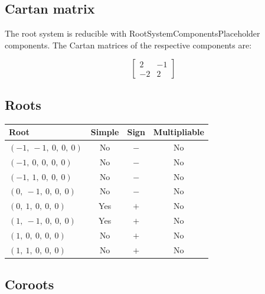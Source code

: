 \documentclass[11pt]{article}
\theoremstyle{definition}
\newif\ifrootsystemirreducible
\begin{document}
\subsection{Cartan matrix}

\ifrootsystemirreducible
The root system is irreducible and has Cartan matrix:
\else
The root system is reducible with RootSystemComponentsPlaceholder components. The Cartan matrices of the respective components are:
\fi

\[
\left[\begin{matrix}2 & -1\\-2 & 2\end{matrix}\right]
\]

\subsection{Roots}

\begin{tabular}{|l|c|c|c|}
    \hline
    \textbf{Root} & \textbf{Simple} & \textbf{Sign} & \textbf{Multipliable} \\
    \hline
    $\left( -1, \  -1, \  0, \  0, \  0\right)$ & No & $-$ & No \\
    \hline
    $\left( -1, \  0, \  0, \  0, \  0\right)$ & No & $-$ & No \\
    \hline
    $\left( -1, \  1, \  0, \  0, \  0\right)$ & No & $-$ & No \\
    \hline
    $\left( 0, \  -1, \  0, \  0, \  0\right)$ & No & $-$ & No \\
    \hline
    $\left( 0, \  1, \  0, \  0, \  0\right)$ & Yes & $+$ & No \\
    \hline
    $\left( 1, \  -1, \  0, \  0, \  0\right)$ & Yes & $+$ & No \\
    \hline
    $\left( 1, \  0, \  0, \  0, \  0\right)$ & No & $+$ & No \\
    \hline
    $\left( 1, \  1, \  0, \  0, \  0\right)$ & No & $+$ & No \\
    \hline
\end{tabular}


\subsection{Coroots}
\end{document}
